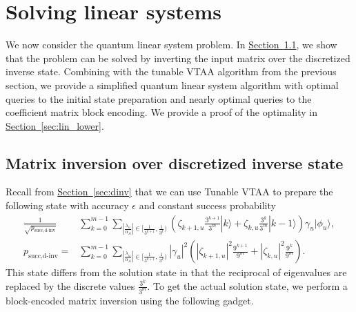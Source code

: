 \documentclass[letterpaper,onecolumn,11pt,accepted=2026-02-14]{quantumarticle}
\newcommand{\abs}[1]{\left\lvert#1\right\rvert}
\theoremstyle{remark}
\theoremstyle{plain}
\renewcommand{\sec}[1]{\hyperref[sec:#1]{Section~\ref*{sec:#1}}}
\newcommand{\ket}[1]{|#1\rangle}
\begin{document}
\section{Solving linear systems}
\label{sec:lin}

We now consider the quantum linear system problem. In \sec{lin_inv}, we show that the problem can be solved by inverting the input matrix over the discretized inverse state. Combining with the tunable VTAA algorithm from the previous section, we provide a simplified quantum linear system algorithm with optimal queries to the initial state preparation and nearly optimal queries to the coefficient matrix block encoding. We provide a proof of the optimality in \sec{lin_lower}.

\subsection{Matrix inversion over discretized inverse state}
\label{sec:lin_inv}
Recall from \sec{dinv} that we can use Tunable VTAA to prepare the following state with accuracy $\epsilon$ and constant success probability
\begin{equation}
\begin{aligned}
    \frac{1}{\sqrt{p_{\text{succ,d-inv}}}}&\sum_{k=0}^{m-1}\sum_{\abs{\frac{\lambda_u}{\alpha_A}}\in\big[\frac{1}{3^{k+1}},\frac{1}{3^k}\big)}
    \left(\zeta_{k+1,u}\frac{3^{k+1}}{3^m}
    \ket{k}
    +\zeta_{k,u}\frac{3^{k}}{3^m}
    \ket{k-1}\right)
    \gamma_u\ket{\phi_u},\\
    p_{\text{succ,d-inv}}=&\sum_{k=0}^{m-1}\sum_{\abs{\frac{\lambda_u}{\alpha_A}}\in\big[\frac{1}{3^{k+1}},\frac{1}{3^k}\big)}\abs{\gamma_u}^2\left(\abs{\zeta_{k+1,u}}^2\frac{9^{k+1}}{9^m}
    +\abs{\zeta_{k,u}}^2\frac{9^k}{9^m}\right).
\end{aligned}
\end{equation}
This state differs from the solution state in that the reciprocal of eigenvalues are replaced by the discrete values $\frac{3^k}{3^m}$. To get the actual solution state, we perform a block-encoded matrix inversion using the following gadget.
\end{document}

